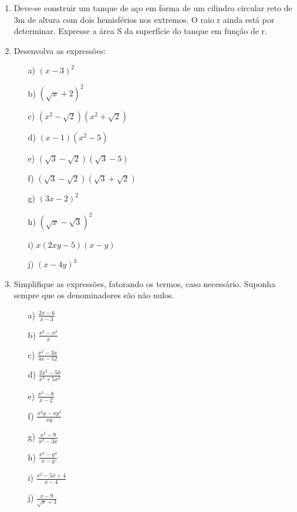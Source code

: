 \begin{enumerate}
 \item Deve-se construir um tanque de aço em forma de um cilindro circular reto de 3m de altura com
dois hemisférios nos extremos. O raio r ainda está por determinar. Expresse a área S da
superfície do tanque em função de r.
\item Desenvolva as expressões:

\begin{minipage}[t]{.44\textwidth}
\begin{itemize}
\item[a)] $ (x-3)^2$
\item[b)] $ (\sqrt{x}+2)^2$
\item[c)] $(x^2-\sqrt{2})(x^2+\sqrt{2})$
\item[d)] $(x-1)(x^2-5)$
\item[e)] $(\sqrt{3}-\sqrt{2})(\sqrt{3}-5)$
\end{itemize}
\end{minipage}
\begin{minipage}[t]{.44\textwidth}
\begin{itemize}
\item[f)] $(\sqrt{3}-\sqrt{2})(\sqrt{3}+\sqrt{2})$
\item[g)] $(3x-2)^2$
\item[h)] $ (\sqrt{x}-\sqrt{3})^2$
\item[i)] $x(2xy-5)(x-y)$
\item[j)] $(x-4y)^3$
\end{itemize}
\end{minipage}
\item Simplifique as expressões, fatorando os termos, caso necessário. Suponha sempre que os denominadores são não nulos.

\begin{minipage}[t]{.44\textwidth}
\begin{itemize}
\item[a)] $ \frac{2x-6}{x-3}$
\item[b)] $ \frac{x^2-x^3}{x}$
\item[c)] $\frac{x^2-3x}{4x-12}$
\item[d)] $\frac{2x^2-50}{x^3+5x^2}$
\item[e)] $\frac{x^3-8}{x-2}$
\end{itemize}
\end{minipage}
\begin{minipage}[t]{.44\textwidth}
\begin{itemize}
\item[f)] $ \frac{x^2y-xy^2}{xy}$
\item[g)] $ \frac{x^2-9}{x^2-3x}$
\item[h)] $\frac{x^4-y^4}{x-y}$
\item[i)] $\frac{x^2-5x+4}{x-4}$
\item[j)] $\frac{x-9}{\sqrt{x}+3}$
\end{itemize}
\end{minipage}


\end{enumerate}
